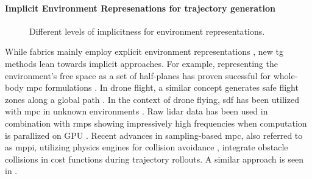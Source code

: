 \paragraph{Implicit Environment Represenations for trajectory generation}

\begin{figure}
  \centering
  
  \caption{Different levels of implicitness for environment representations.}
  \label{fig:ral24_overview}
\end{figure}

While \ac{fabrics} mainly employ explicit environment
representations \cite{Spahn2023,Ratliff2020}, new \ac{tg}
methods lean towards implicit approaches.
For example, representing the environment's free space as 
a set of half-planes has proven sucessful for whole-body
\ac{mpc} formulations \cite{Spahn2021}.
In drone flight, a similar
concept generates safe flight zones along a global path
\cite{Liu2017a,Tordesillas2019a}. In the context of drone
flying, \ac{sdf} has been utilized with \ac{mpc} in unknown
environments \cite{Oleynikova2017voxblox}. Raw lidar data
has been used in combination with \acp{rmp} showing
impressively high frequencies when computation is parallized
on GPU \cite{Pantic2023obstacle}. Recent advances in
sampling-based \ac{mpc}, also referred to as \ac{mppi}, utilizing physics engines for
collision avoidance \cite{Pezzato2023sampling}, integrate
obstacle collisions in cost functions during trajectory
rollouts. A similar approach is seen in
\cite{Sundaralingam2023curobo}.

